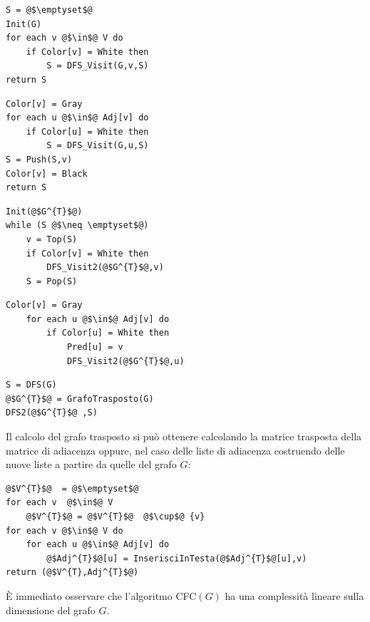 \begin{minipage}{.45\textwidth}
	\begin{lstlisting}[caption={\textsc{DFS}(G)}, label={lst:dfs_cfc},language=asd]
S = @$\emptyset$@
Init(G)
for each v @$\in$@ V do
	if Color[v] = White then
		S = DFS_Visit(G,v,S)
return S
\end{lstlisting}
\end{minipage}
\hfil
\begin{minipage}{.45\textwidth}
	\begin{lstlisting}[caption={\textsc{DFS\_Visit}(G,v,S)}, label={lst:dfs_visit_cfc},language=asd]
Color[v] = Gray
for each u @$\in$@ Adj[v] do
	if Color[u] = White then
		S = DFS_Visit(G,u,S)
S = Push(S,v)
Color[v] = Black
return S
\end{lstlisting}
\end{minipage}

\begin{minipage}{.45\textwidth}
	\begin{lstlisting}[caption={\textsc{DFS2}($G^{T}$,S)},language=asd]
Init(@$G^{T}$@)
while (S @$\neq \emptyset$@)
	v = Top(S)
	if Color[v] = White then
		DFS_Visit2(@$G^{T}$@,v)
	S = Pop(S)
\end{lstlisting}
\end{minipage}
\hfil
\begin{minipage}{.45\textwidth}
	\begin{lstlisting}[caption={\textsc{DFS\_Visit2}($G^{T}$,v)},language=asd]
	Color[v] = Gray
	for each u @$\in$@ Adj[v] do
		if Color[u] = White then
			Pred[u] = v
			DFS_Visit2(@$G^{T}$@,u)
\end{lstlisting}
\end{minipage}

\begin{lstlisting}[caption={\textsc{CFC}(G)},language=asd]
S = DFS(G)
@$G^{T}$@ = GrafoTrasposto(G)
DFS2(@$G^{T}$@ ,S)
\end{lstlisting}

Il calcolo del grafo trasposto si può ottenere calcolando la matrice trasposta della matrice di adiacenza oppure, nel caso delle liste di adiacenza costruendo delle nuove liste a partire da quelle del grafo $G$:
\begin{lstlisting}[caption={\textsc{GrafoTrasposto}(G)},language=asd]
@$V^{T}$@  = @$\emptyset$@
for each v  @$\in$@ V
	@$V^{T}$@ = @$V^{T}$@  @$\cup$@ {v}
for each v @$\in$@ V do
	for each u @$\in$@ Adj[v] do
		@$Adj^{T}$@[u] = InserisciInTesta(@$Adj^{T}$@[u],v)
return (@$V^{T},Adj^{T}$@)
\end{lstlisting}
È immediato osservare che l'algoritmo \textsc{CFC}$(G)$ ha una complessità lineare sulla dimensione del grafo $G$.

